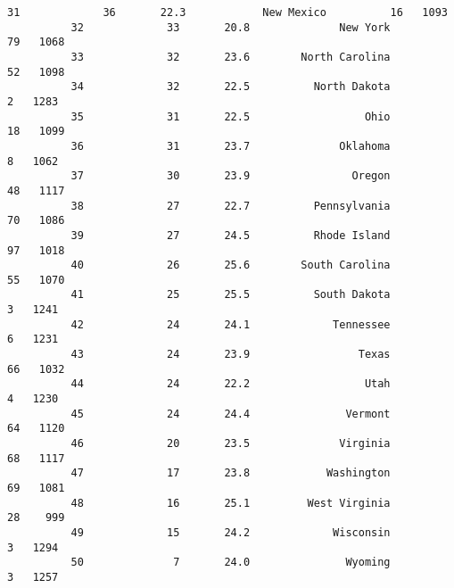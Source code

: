 \documentclass[11pt]{article}
\begin{document}
\begin{Verbatim}[commandchars=\\\{\}]
          31             36       22.3            New Mexico          16   1093   
          32             33       20.8              New York          79   1068   
          33             32       23.6        North Carolina          52   1098   
          34             32       22.5          North Dakota           2   1283   
          35             31       22.5                  Ohio          18   1099   
          36             31       23.7              Oklahoma           8   1062   
          37             30       23.9                Oregon          48   1117   
          38             27       22.7          Pennsylvania          70   1086   
          39             27       24.5          Rhode Island          97   1018   
          40             26       25.6        South Carolina          55   1070   
          41             25       25.5          South Dakota           3   1241   
          42             24       24.1             Tennessee           6   1231   
          43             24       23.9                 Texas          66   1032   
          44             24       22.2                  Utah           4   1230   
          45             24       24.4               Vermont          64   1120   
          46             20       23.5              Virginia          68   1117   
          47             17       23.8            Washington          69   1081   
          48             16       25.1         West Virginia          28    999   
          49             15       24.2             Wisconsin           3   1294   
          50              7       24.0               Wyoming           3   1257   
          

\end{Verbatim}
\end{document}
